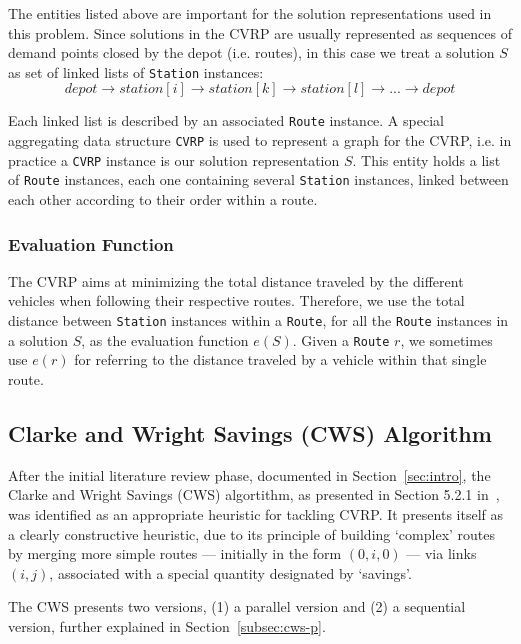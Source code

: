 The entities listed above are important for the solution representations used in 
this problem. Since solutions in the CVRP are usually represented as sequences 
of demand points closed by the depot (i.e. routes), in this case 
we treat a solution $S$ as set of linked lists of \verb?Station? instances:
\[ depot \rightarrow station[i] \rightarrow station[k] \rightarrow station[l] \rightarrow ... \rightarrow depot \] 

Each 
linked list is described by an associated \verb?Route? instance. A special 
aggregating data structure \verb?CVRP? is used to represent a graph for the 
CVRP, i.e. in practice a \verb+CVRP+ instance is our solution representation 
$S$. This entity holds a list of \verb?Route? instances, each one 
containing several \verb?Station? instances, linked between each other 
according to their order within a route.\vertbreak

\subsubsection{Evaluation Function}
\label{subsubsec:eval-fun}

The CVRP aims at minimizing the total distance traveled by the different 
vehicles when following their respective routes. Therefore, we use the total 
distance between \verb+Station+ instances within a \verb+Route+, for all the 
\verb+Route+ instances in a solution $S$, as the evaluation function 
$e(S)$. Given a \verb+Route+ $r$, we sometimes use $e(r)$ for referring to 
the distance traveled by a vehicle within that single route.\vertbreak

\subsection{Clarke and Wright Savings (CWS) Algorithm}
\label{subsec:overview}

After the initial literature review phase, documented in
 Section~\ref{sec:intro}, the Clarke and Wright Savings (CWS) algortithm, as 
presented in Section 5.2.1 in~\cite{Toth2002}, was identified as an appropriate 
heuristic for tackling CVRP. It presents itself as a clearly constructive 
heuristic, due to its principle of building `complex' routes by merging more 
simple routes --- initially in the form $(0, i, 0)$ --- via links $(i,j)$, 
associated with a special quantity designated by `savings'.\vertbreak

The CWS presents two versions, (1) a parallel version and (2) a sequential 
version, further explained in Section~\ref{subsec:cws-p}.

